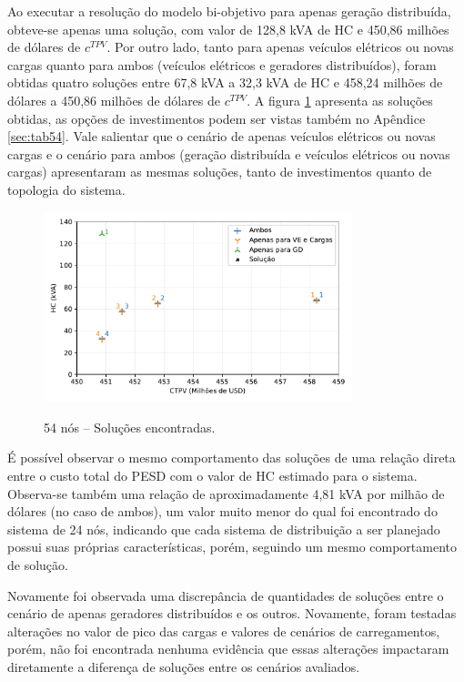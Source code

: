Ao executar a resolução do modelo bi-objetivo para apenas geração distribuída, obteve-se apenas uma solução, com valor de 128,8 kVA de \ac{HC} e 450,86 milhões de dólares de $c^{TPV}$. Por outro lado, tanto para apenas veículos elétricos ou novas cargas quanto para ambos (veículos elétricos e geradores distribuídos), foram obtidas quatro soluções entre 67,8 kVA a 32,3 kVA de \ac{HC} e 458,24 milhões de dólares a 450,86 milhões de dólares de $c^{TPV}$. A figura \ref{fig:54_pareto} apresenta as soluções obtidas, as opções de investimentos podem ser vistas também no Apêndice \ref{sec:tab54}. Vale salientar que o cenário de apenas veículos elétricos ou novas cargas e o cenário para ambos (geração distribuída e veículos elétricos ou novas cargas) apresentaram as mesmas soluções, tanto de investimentos quanto de topologia do sistema.
\vspace{-0.5cm}
\begin{figure}[h]
 	\centering
    \caption{54 nós -- Soluções encontradas.}
    \includegraphics[width=0.8\textwidth]{cap4/resultados/54_pareto.pdf}\\
    \label{fig:54_pareto}
\end{figure}
\vspace{-0.8cm}

É possível observar o mesmo comportamento das soluções de uma relação direta entre o custo total do \ac{PESD} com o valor de \ac{HC} estimado para o sistema. Observa-se também uma relação de aproximadamente 4,81 kVA por milhão de dólares (no caso de ambos), um valor muito menor do qual foi encontrado do sistema de 24 nós, indicando que cada sistema de distribuição a ser planejado possui suas próprias características, porém, seguindo um mesmo comportamento de solução. 


Novamente foi observada uma discrepância de quantidades de soluções entre o cenário de apenas geradores distribuídos e os outros. Novamente, foram testadas alterações no valor de pico das cargas e valores de cenários de carregamentos, porém, não foi encontrada nenhuma evidência que essas alterações impactaram diretamente a diferença de soluções entre os cenários avaliados.

